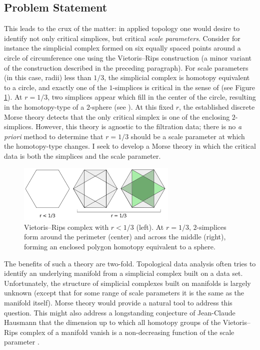 \documentclass[11pt]{amsart}
\begin{document}
\subsection{Problem Statement} 
This leads to the crux of the matter: in applied topology one would desire to identify not only critical simplices, but critical \emph{scale parameters}.
Consider for instance the simplicial complex formed on six equally spaced points around a circle of circumference one using the Vietoris--Rips construction (a minor variant of the construction described in the preceding paragraph).
For scale parameters (in this case, radii) less than $1/3$, the simplicial complex is homotopy equivalent to a circle, and exactly one of the $1$-simplices is critical in the sense of \cite{FormanMorseTheoryCell1998} (see Figure \ref{fig:vrcircle}).
At $r = 1/3$, two simplices appear which fill in the center of the circle, resulting in the homotopy-type of a $2$-sphere (see \cite{AdamaszekVietorisRipsComplexes}).
At this fixed $r$, the established discrete Morse theory detects that the only critical simplex is one of the enclosing $2$-simplices.
However, this theory is agnostic to the filtration data; there is no \emph{a priori} method to determine that $r = 1/3$ should be a scale parameter at which the homotopy-type changes.
I seek to develop a Morse theory in which the critical data is both the simplices and the scale parameter.

\begin{figure}[h]
\includegraphics[width=3in]{rips_critical.png}
\caption{Vietoris--Rips complex with $r < 1/3$ (left). At $r = 1/3$, $2$-simplices form around the perimeter (center) and across the middle (right), forming an enclosed polygon homotopy equivalent to a sphere.}
\label{fig:vrcircle}
\end{figure}

The benefits of such a theory are two-fold. 
Topological data analysis often tries to identify an underlying manifold from a simplicial complex built on a data set.
Unfortunately, the structure of simplicial complexes built on manifolds is largely unknown (except that for some range of scale parameters it is the same as the manifold itself).
Morse theory would provide a natural tool to address this question. %
This might also address a longstanding conjecture of Jean-Claude Hausmann that the dimension up to which all homotopy groups of the Vietoris--Rips complex of a manifold vanish is a non-decreasing function of the scale parameter \cite{HausmannVietorisRipsComplexes1995}.
\end{document}
